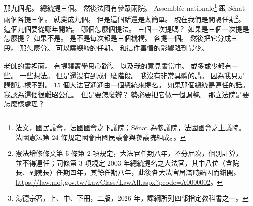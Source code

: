 \hypertarget{w01:cue:1817}{}那九個呢。
\hypertarget{w01:cue:1818}{}總統提三個。
\hypertarget{w01:cue:1819}{}然後法國有參眾兩院。
\hypertarget{w01:cue:1820}{}Assemblée nationale\footnote{法文，國民議會，法國國會之下議院；Sénat 為參議院，法國國會之上議院。法國憲法第 24 條規定國會由國民議會與參議院組成。\cite[第 24 條]{const1958}。} 跟 Sénat 兩個各提三個。
\hypertarget{w01:cue:1821}{}就變成九個。
\hypertarget{w01:cue:1822}{}但是這個話還是太簡單。
\hypertarget{w01:cue:1823}{}現在我們是間隔任期\footnote{憲法增修條文第 5 條第 2 項規定，大法官任期八年，不分屆次，個別計算，並不得連任；同條第 3 項規定 2003 年總統提名之大法官，其中八位（含院長、副院長）任期四年，其餘任期八年，此後各大法官屆滿時點因而錯開。\url{https://law.moj.gov.tw/LawClass/LawAll.aspx?pcode=A0000002}。}。
\hypertarget{w01:cue:1824}{}這個九個要從哪年開始。
\hypertarget{w01:cue:1825}{}哪個怎麼個提法。
\hypertarget{w01:cue:1826}{}三個一次提嗎？
\hypertarget{w01:cue:1827}{}如果是三個一次提是怎麼提？
\hypertarget{w01:cue:1828}{}如果不是。
\hypertarget{w01:cue:1829}{}是不是每次都是三個機構。
\hypertarget{w01:cue:1830}{}各提一個。
\hypertarget{w01:cue:1831}{}然後把它分成三段。
\hypertarget{w01:cue:1832}{}那怎麼分。
\hypertarget{w01:cue:1833}{}可以讓總統的任期。
\hypertarget{w01:cue:1834}{}和這件事情的影響降到最少。

\hypertarget{w01:cue:1835}{}老師的書裡面。
\hypertarget{w01:cue:1836}{}有提釋憲學思心路\footnote{湯德宗著，上、中、下冊，二版，2026 年，課綱所列四部指定教科書之一。}。
\hypertarget{w01:cue:1837}{}以及我的意見書當中。
\hypertarget{w01:cue:1838}{}或多或少都有一些。
\hypertarget{w01:cue:1839}{}一些想法。
\hypertarget{w01:cue:1840}{}但是還沒有到成什麼階段。
\hypertarget{w01:cue:1841}{}我沒有非常具體的講。
\hypertarget{w01:cue:1842}{}因為我只是講說這樣不對。
\hypertarget{w01:cue:1843}{}15 個大法官通通由一個總統來提名。
\hypertarget{w01:cue:1844}{}如果那個總統是連任的話。
\hypertarget{w01:cue:1845}{}我認為這個很難昭公信。
\hypertarget{w01:cue:1846}{}但是要怎麼辦？
\hypertarget{w01:cue:1847}{}勢必要把它做一個調整。
\hypertarget{w01:cue:1848}{}那立法院是要怎麼樣處理？

